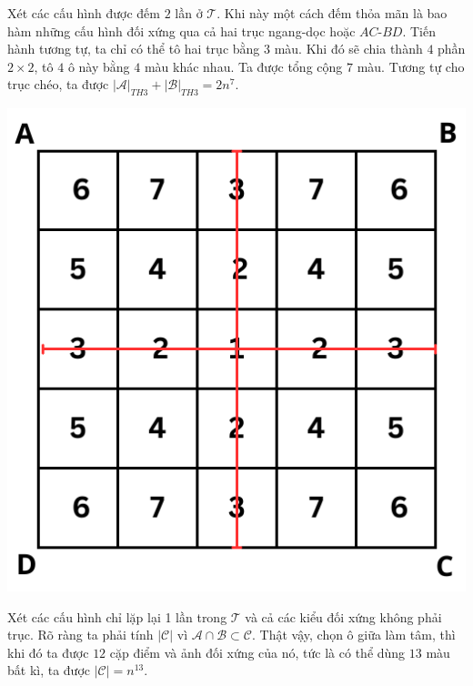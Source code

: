 \documentclass[11pt]{scrartcl}
\begin{document}
\begin{itemize}[label=, leftmargin=0em, itemsep=-0em]
\begin{sol}
            Xét các cấu hình được đếm $2$ lần ở $\mathcal{T}$. Khi này một cách đếm thỏa mãn là bao hàm những cấu hình đối xứng qua cả hai trục ngang-dọc hoặc $AC$-$BD$. Tiến hành tương tự, ta chỉ có thể tô hai trục bằng $3$ màu. Khi đó sẽ chia thành $4$ phần $2\times2$, tô $4$ ô này bằng $4$ màu khác nhau. Ta được tổng cộng $7$ màu. Tương tự cho trục chéo, ta được $|\mathcal{A}|_{TH3} + |\mathcal{B}|_{TH3} = 2n^{7}$.
            \begin{center}
                \includegraphics[scale=0.57]{+.pdf}
            \end{center}
            Xét các cấu hình chỉ lặp lại 1 lần trong $\mathcal{T}$ và cả các kiểu đối xứng không phải trục. Rõ ràng ta phải tính $|\mathcal{C}|$ vì $\mathcal{A} \cap \mathcal{B} \subset \mathcal{C}$. Thật vậy, chọn ô giữa làm tâm, thì khi đó ta được $12$ cặp điểm và ảnh đối xứng của nó, tức là có thể dùng $13$ màu bất kì, ta được $|\mathcal{C}| = n^{13}$.
            \begin{center}

\end{center}
\end{sol}
\end{itemize}
\end{document}
